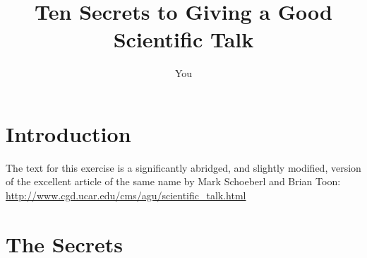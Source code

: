 \documentclass[12pt]{article}
\begin{document}
\title{Ten Secrets to Giving a Good Scientific Talk}
\author{You}
\maketitle

\section{Introduction}

The text for this exercise is a significantly abridged, and slightly modified, version of the excellent article of the same name by Mark Schoeberl and Brian Toon:
\url{http://www.cgd.ucar.edu/cms/agu/scientific_talk.html}

\section{The Secrets}
\end{document}
